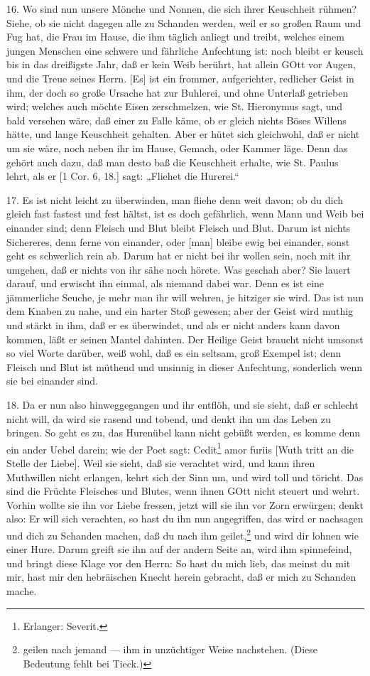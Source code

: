 16. Wo sind nun unsere Mönche und Nonnen, die sich ihrer Keuschheit rühmen? Siehe, ob sie nicht dagegen alle zu Schanden werden, weil er so großen Raum und Fug hat, die Frau im Hause, die ihm täglich anliegt und treibt, welches einem jungen Menschen eine schwere und fährliche Anfechtung ist: noch bleibt er keusch bis in das dreißigste Jahr, daß er kein Weib berührt, hat allein GOtt vor Augen, und die Treue seines Herrn. [Es] ist ein frommer, aufgerichter, redlicher Geist in ihm, der doch so große Ursache hat zur Buhlerei, und ohne Unterlaß getrieben wird; welches auch möchte Eisen zerschmelzen, wie St. Hieronymus sagt, und bald versehen wäre, daß einer zu Falle käme, ob er gleich nichts Böses Willens hätte, und lange Keuschheit gehalten. Aber er hütet sich gleichwohl, daß er nicht um sie wäre, noch neben ihr im Hause, Gemach, oder Kammer läge. Denn das gehört auch dazu, daß man desto baß die Keuschheit erhalte, wie St. Paulus lehrt, als er [1 Cor. 6, 18.] sagt: „Fliehet die Hurerei.“

17. Es ist nicht leicht zu überwinden, man fliehe denn weit davon; ob du dich gleich fast fastest und fest hältst, ist es doch gefährlich, wenn Mann und Weib bei einander sind; denn Fleisch und Blut bleibt Fleisch und Blut. Darum ist nichts Sichereres, denn ferne von einander, oder [man] bleibe ewig bei einander, sonst geht es schwerlich rein ab. Darum hat er nicht bei ihr wollen sein, noch mit ihr umgehen, daß er nichts von ihr sähe noch hörete. Was geschah aber? Sie lauert darauf, und erwischt ihn einmal, als niemand dabei war. Denn es ist eine jämmerliche Seuche, je mehr man ihr will wehren, je hitziger sie wird. Das ist nun dem Knaben zu nahe, und ein harter Stoß gewesen; aber der Geist wird muthig und stärkt in ihm, daß er es überwindet, und als er nicht anders kann davon kommen, läßt er seinen Mantel dahinten. Der Heilige Geist braucht nicht umsonst so viel Worte darüber, weiß wohl, daß es ein seltsam, groß Exempel ist; denn Fleisch und Blut ist müthend und unsinnig in dieser Anfechtung, sonderlich wenn sie bei einander sind.

18. Da er nun also hinweggegangen und ihr entflöh, und sie sieht, daß er schlecht nicht will, da wird sie rasend und tobend, und denkt ihn um das Leben zu bringen. So geht es zu, das Hurenübel kann nicht gebüßt werden, es komme denn ein ander Uebel darein; wie der Poet sagt: Cedit\footnote{Erlanger: Severit.} amor furiis [Wuth tritt an die Stelle der Liebe]. Weil sie sieht, daß sie verachtet wird, und kann ihren Muthwillen nicht erlangen, kehrt sich der Sinn um, und wird toll und töricht. Das sind die Früchte Fleisches und Blutes, wenn ihnen GOtt nicht steuert und wehrt. Vorhin wollte sie ihn vor Liebe fressen, jetzt will sie ihn vor Zorn erwürgen; denkt also: Er will sich verachten, so hast du ihn nun angegriffen, das wird er nachsagen und dich zu Schanden machen, daß du nach ihm geilet,\footnote{geilen nach jemand — ihm in unzüchtiger Weise nachstehen. (Diese Bedeutung fehlt bei Tieck.)} und wird dir lohnen wie einer Hure. Darum greift sie ihn auf der andern Seite an, wird ihm spinnefeind, und bringt diese Klage vor den Herrn: So hast du mich lieb, das meinst du mit mir, hast mir den hebräischen Knecht herein gebracht, daß er mich zu Schanden mache.

